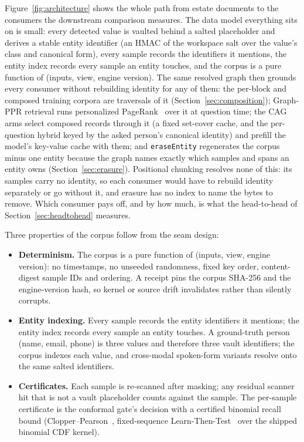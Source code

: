 \documentclass{article}
\begin{document}
Figure~\ref{fig:architecture} shows the whole path from estate documents to the consumers the downstream comparison measures. The data model everything sits on is small: every detected value is vaulted behind a salted placeholder and derives a stable entity identifier (an HMAC of the workspace salt over the value's class and canonical form), every sample records the identifiers it mentions, the entity index records every sample an entity touches, and the corpus is a pure function of (inputs, view, engine version). The same resolved graph then grounds every consumer without rebuilding identity for any of them: the per-block and composed training corpora are traversals of it (Section~\ref{sec:composition}); Graph-PPR retrieval runs personalized PageRank~\cite{haveliwala2002topic} over it at question time; the CAG arms select composed records through it (a fixed set-cover cache, and the per-question hybrid keyed by the asked person's canonical identity) and prefill the model's key-value cache with them; and \texttt{eraseEntity} regenerates the corpus minus one entity because the graph names exactly which samples and spans an entity owns (Section~\ref{sec:erasure}). Positional chunking resolves none of this: its samples carry no identity, so each consumer would have to rebuild identity separately or go without it, and erasure has no index to name the bytes to remove. Which consumer pays off, and by how much, is what the head-to-head of Section~\ref{sec:headtohead} measures.

Three properties of the corpus follow from the seam design:

\begin{itemize}
  \item \textbf{Determinism.} The corpus is a pure function of (inputs, view, engine version): no timestamps, no unseeded randomness, fixed key order, content-digest sample IDs and ordering. A receipt pins the corpus SHA-256 and the engine-version hash, so kernel or source drift invalidates rather than silently corrupts.
  \item \textbf{Entity indexing.} Every sample records the entity identifiers it mentions; the entity index records every sample an entity touches. A ground-truth person (name, email, phone) is three values and therefore three vault identifiers; the corpus indexes each value, and cross-modal spoken-form variants resolve onto the same salted identifiers.
  \item \textbf{Certificates.} Each sample is re-scanned after masking; any residual scanner hit that is not a vault placeholder counts against the sample. The per-sample certificate is the conformal gate's decision with a certified binomial recall bound (Clopper--Pearson~\cite{clopper1934binomial}, fixed-sequence Learn-Then-Test~\cite{angelopoulos2021ltt} over the shipped binomial CDF kernel).
\end{itemize}
\end{document}
